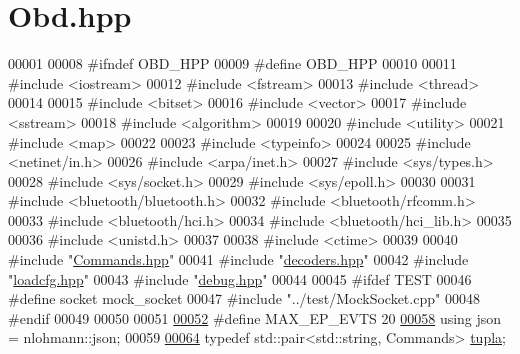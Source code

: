 \hypertarget{Obd_8hpp_source}{}\section{Obd.\+hpp}
\label{Obd_8hpp_source}

\begin{DoxyCode}
00001 
00008 \textcolor{preprocessor}{#ifndef OBD\_HPP}
00009 \textcolor{preprocessor}{#define OBD\_HPP}
00010 
00011 \textcolor{preprocessor}{#include <iostream>}
00012 \textcolor{preprocessor}{#include <fstream>}
00013 \textcolor{preprocessor}{#include <thread>}
00014 
00015 \textcolor{preprocessor}{#include <bitset>}
00016 \textcolor{preprocessor}{#include <vector>}
00017 \textcolor{preprocessor}{#include <sstream>}
00018 \textcolor{preprocessor}{#include <algorithm>}
00019 
00020 \textcolor{preprocessor}{#include <utility>}
00021 \textcolor{preprocessor}{#include <map>}
00022 
00023 \textcolor{preprocessor}{#include <typeinfo>}
00024 
00025 \textcolor{preprocessor}{#include <netinet/in.h>}
00026 \textcolor{preprocessor}{#include <arpa/inet.h>}
00027 \textcolor{preprocessor}{#include <sys/types.h>}
00028 \textcolor{preprocessor}{#include <sys/socket.h>}
00029 \textcolor{preprocessor}{#include <sys/epoll.h>}
00030 
00031 \textcolor{preprocessor}{#include <bluetooth/bluetooth.h>}
00032 \textcolor{preprocessor}{#include <bluetooth/rfcomm.h>}
00033 \textcolor{preprocessor}{#include <bluetooth/hci.h>}
00034 \textcolor{preprocessor}{#include <bluetooth/hci\_lib.h>}
00035 
00036 \textcolor{preprocessor}{#include <unistd.h>}
00037 
00038 \textcolor{preprocessor}{#include <ctime>}
00039 
00040 \textcolor{preprocessor}{#include "\hyperlink{Commands_8hpp}{Commands.hpp}"}
00041 \textcolor{preprocessor}{#include "\hyperlink{decoders_8hpp}{decoders.hpp}"}
00042 \textcolor{preprocessor}{#include "\hyperlink{loadcfg_8hpp}{loadcfg.hpp}"}
00043 \textcolor{preprocessor}{#include "\hyperlink{debug_8hpp}{debug.hpp}"}
00044 
00045 \textcolor{preprocessor}{#ifdef TEST}
00046 \textcolor{preprocessor}{    #define socket mock\_socket}
00047 \textcolor{preprocessor}{    #include "../test/MockSocket.cpp"}
00048 \textcolor{preprocessor}{#endif}
00049 
00050 
00051 
\hyperlink{Obd_8hpp_a115fbf8b5fd0f0b7e912dd166068415b}{00052} \textcolor{preprocessor}{#define MAX\_EP\_EVTS 20 }
\hyperlink{Obd_8hpp_ab701e3ac61a85b337ec5c1abaad6742d}{00058} \textcolor{preprocessor}{using json = nlohmann::json; }
00059 
\hyperlink{Obd_8hpp_aaa63a77fc61ef01154d73b6fac67f1af}{00064} \textcolor{keyword}{typedef} std::pair<std::string, Commands> \hyperlink{Obd_8hpp_aaa63a77fc61ef01154d73b6fac67f1af}{tupla};

\end{DoxyCode}
